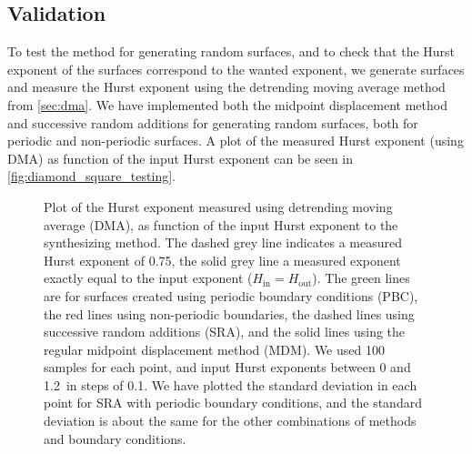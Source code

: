 \subsection{Validation}
To test the method for generating random surfaces, and to check that the Hurst exponent of the surfaces correspond to the wanted exponent, we generate surfaces and measure the Hurst exponent using the detrending moving average method from \cref{sec:dma}. We have implemented both the midpoint displacement method and successive random additions for generating random surfaces, both for periodic and non-periodic surfaces. A plot of the measured Hurst exponent (using DMA) as function of the input Hurst exponent can be seen in \cref{fig:diamond_square_testing}.%
%
\begin{figure}[!htb]%
    \centering%
    {
        \newcommand{\f}{\footnotesize}%
        \newcommand{\x}{\text}%
        \newcommand{\hh}{{\f $H_\x{in}=H_\x{out}$}}%
    }
    \caption[%
        Plot of the Hurst exponent measured using detrending moving average (DMA), as function of the input Hurst exponent to the synthesizing method. The dashed grey line indicates a measured Hurst exponent of 0.75, the solid grey line a measured exponent exactly equal to the input exponent ($H_\text{in} = H_\text{out}$). The green lines are for surfaces created using periodic boundary conditions (PBC), the red lines using non-periodic boundaries, the dashed lines using successive random additions (SRA), and the solid lines using the regular midpoint displacement method (MDM). We used 100 samples for each point, and input Hurst exponents between 0 and 1.2 in steps of 0.1. We have plotted the standard deviation in each point for SRA with periodic boundary conditions, and the standard deviation is about the same for the other combinations. %
    ]{%
        Plot of the Hurst exponent measured using detrending moving average (DMA), as function of the input Hurst exponent to the synthesizing method. The dashed grey line indicates a measured Hurst exponent of 0.75, the solid grey line a measured exponent exactly equal to the input exponent ($H_\text{in} = H_\text{out}$). The green lines are for surfaces created using periodic boundary conditions (PBC), the red lines using non-periodic boundaries, the dashed lines using successive random additions (SRA), and the solid lines using the regular midpoint displacement method (MDM). We used 100 samples for each point, and input Hurst exponents between 0 and 1.2\protect\footnotemark\ in steps of 0.1. We have plotted the standard deviation in each point for SRA with periodic boundary conditions, and the standard deviation is about the same for the other combinations of methods and boundary conditions. %
}
\end{figure}
